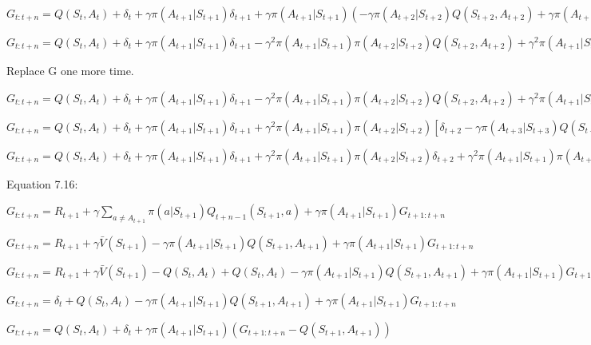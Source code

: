 \documentclass[11pt]{article}
\begin{document}
    \noindent $ G_{t:t+n} = Q(S_{t},A_{t}) + \delta_{t} + \gamma \pi(A_{t+1}|S_{t+1}) \delta_{t+1} + \gamma \pi(A_{t+1}|S_{t+1}) (- \gamma \pi(A_{t+2}|S_{t+2}) Q(S_{t+2},A_{t+2}) + \gamma \pi(A_{t+2}|S_{t+2}) G_{t+2:t+n}) $

    \noindent $ G_{t:t+n} = Q(S_{t},A_{t}) + \delta_{t} + \gamma \pi(A_{t+1}|S_{t+1}) \delta_{t+1} - \gamma^2 \pi(A_{t+1}|S_{t+1}) \pi(A_{t+2}|S_{t+2}) Q(S_{t+2},A_{t+2}) + \gamma^2 \pi(A_{t+1}|S_{t+1}) \pi(A_{t+2}|S_{t+2}) G_{t+2:t+n} $

    Replace G one more time.

    \noindent $ G_{t:t+n} = Q(S_{t},A_{t}) + \delta_{t} + \gamma \pi(A_{t+1}|S_{t+1}) \delta_{t+1} - \gamma^2 \pi(A_{t+1}|S_{t+1}) \pi(A_{t+2}|S_{t+2}) Q(S_{t+2},A_{t+2}) + \gamma^2 \pi(A_{t+1}|S_{t+1}) \pi(A_{t+2}|S_{t+2}) [\delta_{t+2} + Q(S_{t+2},A_{t+2}) - \gamma \pi(A_{t+3}|S_{t+3}) Q(S_{t+3},A_{t+3}) + \gamma \pi(A_{t+3}|S_{t+3}) G_{t+3:t+n}] $

    \noindent $ G_{t:t+n} = Q(S_{t},A_{t}) + \delta_{t} + \gamma \pi(A_{t+1}|S_{t+1}) \delta_{t+1} + \gamma^2 \pi(A_{t+1}|S_{t+1}) \pi(A_{t+2}|S_{t+2}) [\delta_{t+2} - \gamma \pi(A_{t+3}|S_{t+3}) Q(S_{t+3},A_{t+3}) + \gamma \pi(A_{t+3}|S_{t+3}) G_{t+3:t+n}] $

    \noindent $ G_{t:t+n} = Q(S_{t},A_{t}) + \delta_{t} + \gamma \pi(A_{t+1}|S_{t+1}) \delta_{t+1} + \gamma^2 \pi(A_{t+1}|S_{t+1}) \pi(A_{t+2}|S_{t+2}) \delta_{t+2} + \gamma^2 \pi(A_{t+1}|S_{t+1}) \pi(A_{t+2}|S_{t+2}) [ - \gamma \pi(A_{t+3}|S_{t+3}) Q(S_{t+3},A_{t+3}) + \gamma \pi(A_{t+3}|S_{t+3}) G_{t+3:t+n}] $


        Equation 7.16:

    \noindent $ G_{t:t+n} = R_{t+1} + \gamma \sum_{a \neq A_{t+1}} \pi(a|S_{t+1}) Q_{t+n-1}(S_{t+1},a) + \gamma \pi(A_{t+1}|S_{t+1}) G_{t+1:t+n} $

    \noindent $ G_{t:t+n} = R_{t+1} + \gamma \bar{V}(S_{t+1}) - \gamma \pi(A_{t+1}|S_{t+1}) Q(S_{t+1},A_{t+1}) + \gamma \pi(A_{t+1}|S_{t+1}) G_{t+1:t+n} $

    \noindent $ G_{t:t+n} = R_{t+1} + \gamma \bar{V}(S_{t+1}) - Q(S_{t},A_{t}) + Q(S_{t},A_{t}) - \gamma \pi(A_{t+1}|S_{t+1}) Q(S_{t+1},A_{t+1}) + \gamma \pi(A_{t+1}|S_{t+1}) G_{t+1:t+n} $

    \noindent $ G_{t:t+n} = \delta_{t} + Q(S_{t},A_{t}) - \gamma \pi(A_{t+1}|S_{t+1}) Q(S_{t+1},A_{t+1}) + \gamma \pi(A_{t+1}|S_{t+1}) G_{t+1:t+n} $

    \noindent $ G_{t:t+n} = Q(S_{t},A_{t}) + \delta_{t} + \gamma \pi(A_{t+1}|S_{t+1})( G_{t+1:t+n} - Q(S_{t+1},A_{t+1})) $
\end{document}
